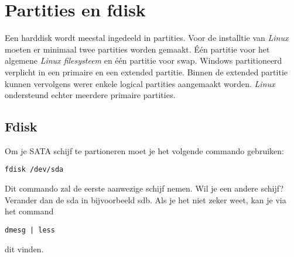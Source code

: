 %
%
%
%

\chapter{Partities en fdisk}\label{app.fdisk}
Een harddisk wordt meestal ingedeeld in partities. Voor de installtie van \emph{Linux} moeten er minimaal twee partities worden gemaakt. \'{E}\'{e}n partitie voor het algemene \emph{Linux filesysteem} en \'{e}\'{e}n partitie voor swap. Windows partitioneerd verplicht in een primaire en een extended partitie. Binnen de extended partitie kunnen vervolgens werer enkele logical partities aangemaakt worden. \emph{Linux} ondersteund echter meerdere primaire partities.

\section{Fdisk}
Om je SATA schijf te partioneren moet je het volgende commando gebruiken:
\begin{lstlisting}
fdisk /dev/sda
\end{lstlisting}
Dit commando zal de eerste aanwezige schijf nemen. Wil je een andere schijf? Verander dan de sda in bijvoorbeeld sdb. Als je het niet zeker weet, kan je via het command
\begin{lstlisting}
dmesg | less
\end{lstlisting}dit vinden. 

